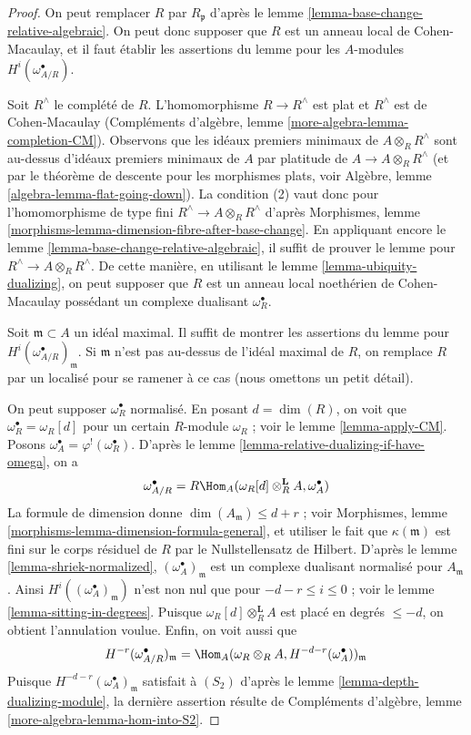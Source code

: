 \begin{proof}
On peut remplacer $R$ par $R_\mathfrak p$ d'après le lemme \ref{lemma-base-change-relative-algebraic}.
On peut donc supposer que $R$ est un anneau local de Cohen-Macaulay,
et il faut établir les assertions du lemme pour les $A$-modules $H^i(\omega_{A/R}^\bullet)$.

\medskip\noindent
Soit $R^\wedge$ le complété de $R$.
L'homomorphisme $R \to R^\wedge$ est plat et $R^\wedge$ est de Cohen-Macaulay
(Compléments d'algèbre, lemme \ref{more-algebra-lemma-completion-CM}).
Observons que les idéaux premiers minimaux de $A \otimes_R R^\wedge$
sont au-dessus d'idéaux premiers minimaux de $A$
par platitude de $A \to A \otimes_R R^\wedge$ (et par le théorème de descente pour les morphismes plats,
voir Algèbre, lemme \ref{algebra-lemma-flat-going-down}).
La condition (2) vaut donc pour l'homomorphisme de type fini $R^\wedge \to A \otimes_R R^\wedge$
d'après Morphismes, lemme \ref{morphisms-lemma-dimension-fibre-after-base-change}.
En appliquant encore le lemme \ref{lemma-base-change-relative-algebraic}, il suffit de prouver le lemme pour $R^\wedge \to A \otimes_R R^\wedge$.
De cette manière, en utilisant le lemme \ref{lemma-ubiquity-dualizing},
on peut supposer que $R$ est un anneau local noethérien de Cohen-Macaulay
possédant un complexe dualisant $\omega_R^\bullet$.

\medskip\noindent
Soit $\mathfrak m \subset A$ un idéal maximal.
Il suffit de montrer les assertions du lemme pour $H^i(\omega_{A/R}^\bullet)_\mathfrak m$.
Si $\mathfrak m$ n'est pas au-dessus de l'idéal maximal de $R$,
on remplace $R$ par un localisé pour se ramener à ce cas
(nous omettons un petit détail).

\medskip\noindent
On peut supposer $\omega_R^\bullet$ normalisé. En posant $d = \dim(R)$,
on voit que $\omega_R^\bullet = \omega_R[d]$ pour un certain $R$-module $\omega_R$ ; voir le lemme \ref{lemma-apply-CM}.
Posons $\omega_A^\bullet = \varphi^!(\omega_R^\bullet)$. D'après le lemme \ref{lemma-relative-dualizing-if-have-omega}, on a
$$
\omega_{A/R}^\bullet =
R\Hom_A(\omega_R[d] \otimes_R^\mathbf{L} A, \omega_A^\bullet)
$$
La formule de dimension donne $\dim(A_\mathfrak m) \leq d + r$ ; voir Morphismes, lemme \ref{morphisms-lemma-dimension-formula-general},
et utiliser le fait que $\kappa(\mathfrak m)$ est fini sur le corps résiduel de $R$
par le Nullstellensatz de Hilbert.
D'après le lemme \ref{lemma-shriek-normalized}, $(\omega_A^\bullet)_\mathfrak m$ est un complexe dualisant normalisé pour $A_\mathfrak m$.
Ainsi $H^i((\omega_A^\bullet)_\mathfrak m)$ n'est non nul que pour $-d - r \leq i \leq 0$ ; voir le lemme \ref{lemma-sitting-in-degrees}.
Puisque $\omega_R[d] \otimes_R^\mathbf{L} A$ est placé en degrés $\leq -d$, on obtient l'annulation voulue.
Enfin, on voit aussi que
$$
H^{-r}(\omega_{A/R}^\bullet)_\mathfrak m =
\Hom_A(\omega_R \otimes_R A, H^{-d - r}(\omega_A^\bullet))_\mathfrak m
$$
Puisque $H^{-d - r}(\omega_A^\bullet)_\mathfrak m$ satisfait à $(S_2)$ d'après le lemme \ref{lemma-depth-dualizing-module},
la dernière assertion résulte de Compléments d'algèbre, lemme \ref{more-algebra-lemma-hom-into-S2}.
\end{proof}



